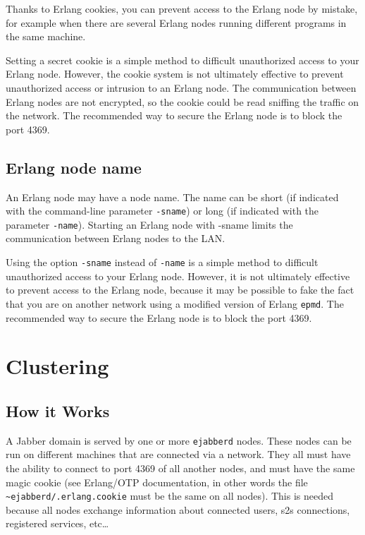 \documentclass[a4paper,10pt]{book}
\newcommand{\ind}[1]{\begin{latexonly}\index{#1}\end{latexonly}}
\newcommand{\term}[1]{\texttt{#1}}
\newcommand{\ejabberd}{\texttt{ejabberd}}
\newcommand{\Jabber}{Jabber}
\begin{document}
Thanks to Erlang cookies, you can prevent access to the Erlang node by mistake,
for example when there are several Erlang nodes running different programs in the same machine.

Setting a secret cookie is a simple method
to difficult unauthorized access to your Erlang node.
However, the cookie system is not ultimately effective 
to prevent unauthorized access or intrusion to an Erlang node.
The communication between Erlang nodes are not encrypted,
so the cookie could be read sniffing the traffic on the network.
The recommended way to secure the Erlang node is to block the port 4369.


\section{Erlang node name}
\label{nodename}

An Erlang node may have a node name.
The name can be short (if indicated with the command-line parameter \term{-sname}) 
or long (if indicated with the parameter \term{-name}). 
Starting an Erlang node with -sname limits the communication between Erlang nodes to the LAN.

Using the option \term{-sname} instead of \term{-name} is a simple method 
to difficult unauthorized access to your Erlang node.
However, it is not ultimately effective  to prevent access to the Erlang node,
because it may be possible to fake the fact that you are on another network 
using a modified version of Erlang \term{epmd}.
The recommended way to secure the Erlang node is to block the port 4369.


\chapter{Clustering}
\label{clustering}
\ind{clustering}

\section{How it Works}
\label{howitworks}
\ind{clustering!how it works}

A \Jabber{} domain is served by one or more \ejabberd{} nodes. These nodes can
be run on different machines that are connected via a network. They all
must have the ability to connect to port 4369 of all another nodes, and must
have the same magic cookie (see Erlang/OTP documentation, in other words the
file \term{\~{}ejabberd/.erlang.cookie} must be the same on all nodes). This is
needed because all nodes exchange information about connected users, s2s
connections, registered services, etc\ldots
\end{document}
